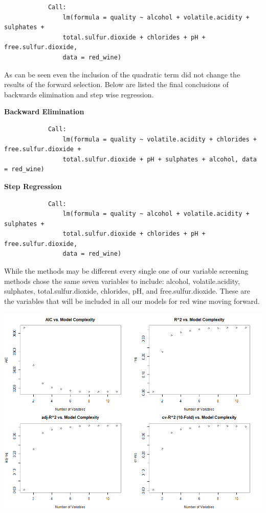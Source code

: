 \documentclass{article}
\begin{document}
	\begin{verbatim}
			Call:
				lm(formula = quality ~ alcohol + volatile.acidity + sulphates + 
				total.sulfur.dioxide + chlorides + pH + free.sulfur.dioxide, 
				data = red_wine)
	\end{verbatim}
	
	As can be seen even the inclusion of the quadratic term did not change the results of the forward selection. Below
	are listed the final conclusions of backwards elimination and step wise regression. 
	
	\textbf{Backward Elimination}
	\begin{verbatim}
			Call:
				lm(formula = quality ~ volatile.acidity + chlorides + free.sulfur.dioxide + 
				total.sulfur.dioxide + pH + sulphates + alcohol, data = red_wine)
	\end{verbatim}
	
	\textbf{Step Regression} 
	\begin{verbatim}
			Call:
				lm(formula = quality ~ alcohol + volatile.acidity + sulphates + 
				total.sulfur.dioxide + chlorides + pH + free.sulfur.dioxide, 
				data = red_wine)
	\end{verbatim}
	
	
	While the methods may be different every single one of our variable screening methods chose the same seven variables 
	to include: alcohol, volatile.acidity, sulphates, total.sulfur.dioxide, chlorides, pH, and free.sulfur.dioxide. These 
	are the variables that will be included in all our models for red wine moving forward. 
	
	\includegraphics[scale=.55]{../plots/Wine/qof_plotR.png}
	
\end{document}
